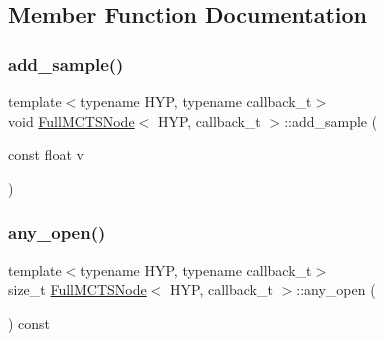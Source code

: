 \subsection{Member Function Documentation}
\mbox{\label{class_full_m_c_t_s_node_a6c2d1085f97b412e6597286c40a7aeea}} 
\subsubsection{\texorpdfstring{add\+\_\+sample()}{add\_sample()}}
{\footnotesize\ttfamily template$<$typename H\+YP, typename callback\+\_\+t$>$ \\
void \hyperlink{class_full_m_c_t_s_node}{Full\+M\+C\+T\+S\+Node}$<$ H\+YP, callback\+\_\+t $>$\+::add\+\_\+sample (\begin{DoxyParamCaption}\item[{const float}]{v }\end{DoxyParamCaption})\hspace{0.3cm}{\ttfamily [inline]}}

\mbox{\label{class_full_m_c_t_s_node_a40737e596a316340132778af3b71cf0a}} 
\subsubsection{\texorpdfstring{any\+\_\+open()}{any\_open()}}
{\footnotesize\ttfamily template$<$typename H\+YP, typename callback\+\_\+t$>$ \\
size\+\_\+t \hyperlink{class_full_m_c_t_s_node}{Full\+M\+C\+T\+S\+Node}$<$ H\+YP, callback\+\_\+t $>$\+::any\+\_\+open (\begin{DoxyParamCaption}{ }\end{DoxyParamCaption}) const\hspace{0.3cm}{\ttfamily [inline]}}

\mbox{\label{class_full_m_c_t_s_node_ab665859a9cdde4017dda841006a26dc2}} 

